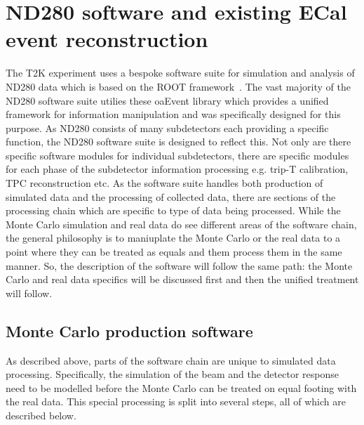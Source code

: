 


\chapter{ND280 software and existing ECal event reconstruction}
\label{chap:ND280Software}
The T2K experiment uses a bespoke software suite for simulation and analysis of ND280 data which is based on the ROOT framework~\cite{Brun199781}.  The vast majority of the ND280 software suite utilies these oaEvent library which provides a unified framework for information manipulation and was specifically designed for this purpose.
As ND280 consists of many subdetectors each providing a specific function, the ND280 software suite is designed to reflect this.  Not only are there specific software modules for individual subdetectors, there are specific modules for each phase of the subdetector information processing e.g. trip-T calibration, TPC reconstruction etc.  \newline
As the software suite handles both production of simulated data and the processing of collected data, there are sections of the processing chain which are specific to type of data being processed.  While the Monte Carlo simulation and real data do see different areas of the software chain, the general philosophy is to maniuplate the Monte Carlo or the real data to a point where they can be treated as equals and them process them in the same manner.  So, the description of the software will follow the same path: the Monte Carlo and real data specifics will be discussed first and then the unified treatment will follow. 
\section{Monte Carlo production software}
\label{sec:MCchain}
As described above, parts of the software chain are unique to simulated data processing.  Specifically, the simulation of the beam and the detector response need to be modelled before the Monte Carlo can be treated on equal footing with the real data.  This special processing is split into several steps, all of which are described below.

